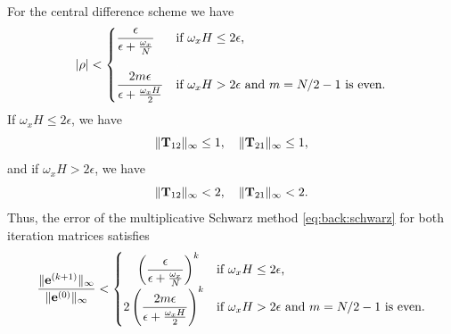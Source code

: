 \begin{thm}\label{thm:1D:central_conv}
For the central difference scheme we have
%
\begin{equation}\label{eq:1D:bound2}
|\rho|  <
\begin{cases}
\displaystyle\frac{\epsilon}{\epsilon +\frac{\omega_x}{N}}  & \mbox{if $\omega_x H\leq 2\epsilon$,} \\
{\textcolor{white}{.}} &{\textcolor{white}{.}}\\
\displaystyle\frac{2m\epsilon}{\epsilon+\frac{\omega_x H}{2}} & \mbox{if $\omega_x H > 2\epsilon$
and $m=N/2-1$ is even.}
\end{cases}
\end{equation}
%
If $\omega_x H \leq 2\epsilon$, we have
%
\begin{equation*}%
\| \T_{12} \|_\infty \leq 1,\quad
\| \T_{21} \|_\infty \leq 1,
\end{equation*}
%
and if $\omega_x H > 2\epsilon$, we have
%
\begin{equation*}%
\| \T_{12} \|_\infty < 2,\quad
\| \T_{21} \|_\infty < 2.
\end{equation*}
%
Thus, the error of the multiplicative Schwarz method \eqref{eq:back:schwarz} for
both iteration matrices satisfies
%
$$\displaystyle\frac{\|\mathbf{e}^{(k+1)}\|_\infty}{\|\mathbf{e}^{(0)}\|_\infty}<
\begin{cases}\;\;\;\;
\left(\displaystyle\frac{\epsilon}{\epsilon +\frac{\omega_x}{N}}\right)^k
 &\mbox{if $\omega_x H\leq 2\epsilon$,} \\
2\left(\displaystyle\frac{2m\epsilon}{\epsilon+\frac{\omega_x H}{2}}\right)^k
 &\mbox{if $\omega_x H > 2\epsilon$
and $m=N/2-1$ is even.}
\end{cases}$$
%
\end{thm}

